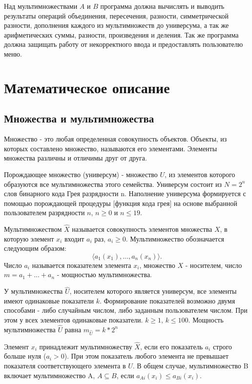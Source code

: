 \documentclass[14pt,a4paper]{extarticle}
\begin{document}
Над мультимножествами $A$ и $B$ программа должна вычислять и выводить результаты операций объединения, пересечения, разности, симметрической разности, дополнения каждого из мультимножеств до универсума, а так же арифметических суммы, разности, произведения и деления. Так же программа должна защищать работу от некорректного ввода и предоставлять пользователю меню.

\section{Математическое описание}
\begingroup
\setlength{\abovedisplayskip}{6pt plus 2pt minus 1pt}
\setlength{\belowdisplayskip}{6pt plus 2pt minus 1pt}
\subsection{Множества и мультимножества}

Множество - это любая определенная совокупность объектов. Объекты, из которых составлено множество, называются его элементами. Элементы множества различны и отличимы друг от друга.

Порождающее множество (универсум) - множество $U$, из элементов которого образуются все мультимножества этого семейства. Универсум состоит из $N=2^n$ слов бинарного кода Грея разрядности n. Наполнение универсума формируется с помощью порождающей процедуры [функция кода грея] на основе выбранной пользователем разрядности $n$, $n\geq 0$ и $n\leq 19$.

Мультимножеством $\hat{X}$ называется совокупность элементов множества $X$, в которую элемент $x_i$ входит $a_i$ раз, $a_i \geq  0$. Мультимножество обозначается следующим образом:
\[
\langle a_1(x_1), \dots, a_n(x_n) \rangle.
\]
Число $a_i$ называется показателем элемента $x_i$, множество $X$ - носителем, число $m=a_1 + ... + a_n$ - мощностью мультимножества.

У мультимножества $\hat{U}$, носителем которого является универсум, все элементы имеют одинаковые показатели $k$. Формирование показателей возможно двумя способами - либо случайным числом, либо заданным пользователем числом. При этом у всех элементов одинаковые показатели. $k\geq 1$, $k\leq 100$. Мощность мультимножества $\hat{U}$ равна $m_{\hat{U}}=k*2^n$

Элемент $x_i$ принадлежит мультимножеству $\hat{X}$, если его показатель $a_i$ строго больше нуля ($a_i>0$). При этом показатель любого элемента не превышает показателя соответствующего элемента в $\hat{U}$. В общем случае, мультимножество B включает мультимножество A, $A \subseteq B$, если $a_{Ai}(x_i)\leq a_{Bi}(x_i)$.
\end{document}
